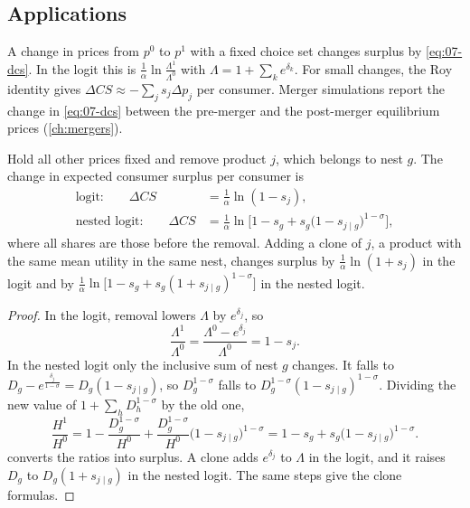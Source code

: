 \subsection{Applications}\label{sec:07-welfare-apps}

A change in prices from $p^0$ to $p^1$ with a fixed choice set changes surplus by \eqref{eq:07-dcs}. In the logit this
is $\frac{1}{\alpha}\ln\frac{\Lambda^1}{\Lambda^0}$ with $\Lambda = 1 + \sum_k e^{\delta_k}$. For small changes, the Roy
identity gives $\Delta CS \approx -\sum_j s_j\Delta p_j$ per consumer. Merger simulations report the change in
\eqref{eq:07-dcs} between the pre-merger and the post-merger equilibrium prices (\cref{ch:mergers}).

\begin{corollary}\label{cor:07-removal}
Hold all other prices fixed and remove product $j$, which belongs to nest $g$. The change in expected consumer
surplus per consumer is
\begin{align}
\text{logit:}\qquad \Delta CS &= \frac{1}{\alpha}\ln(1 - s_j), \label{eq:07-removal-logit}\\
\text{nested logit:}\qquad \Delta CS &= \frac{1}{\alpha}\ln\Big[1 - s_g + s_g\big(1 - s_{j \mid g}\big)^{1-\sigma}\Big], \label{eq:07-removal-nl}
\end{align}
where all shares are those before the removal. Adding a clone of $j$, a product with the same mean utility in the same
nest, changes surplus by $\frac{1}{\alpha}\ln(1 + s_j)$ in the logit and by
$\frac{1}{\alpha}\ln\big[1 - s_g + s_g(1 + s_{j \mid g})^{1-\sigma}\big]$ in the nested logit.
\end{corollary}

\begin{proof}
In the logit, removal lowers $\Lambda$ by $e^{\delta_j}$, so
\begin{equation*}
\frac{\Lambda^1}{\Lambda^0} = \frac{\Lambda^0 - e^{\delta_j}}{\Lambda^0} = 1 - s_j .
\end{equation*}
In the nested logit only the inclusive sum of nest $g$ changes. It falls to
$D_g - e^{\frac{\delta_j}{1-\sigma}} = D_g(1 - s_{j \mid g})$, so $D_g^{1-\sigma}$ falls to
$D_g^{1-\sigma}(1 - s_{j \mid g})^{1-\sigma}$. Dividing the new value of $1 + \sum_h D_h^{1-\sigma}$ by the old one,
\begin{equation*}
\frac{H^1}{H^0} = 1 - \frac{D_g^{1-\sigma}}{H^0} + \frac{D_g^{1-\sigma}}{H^0}\big(1 - s_{j \mid g}\big)^{1-\sigma}
= 1 - s_g + s_g\big(1 - s_{j \mid g}\big)^{1-\sigma} .
\end{equation*}
 converts the ratios into surplus. A clone adds $e^{\delta_j}$ to $\Lambda$ in the logit, and it
raises $D_g$ to $D_g(1 + s_{j \mid g})$ in the nested logit. The same steps give the clone formulas.
\end{proof}

